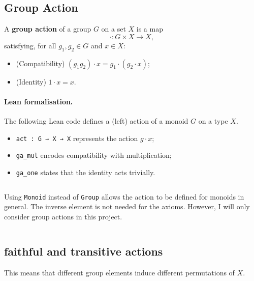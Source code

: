 \documentclass[
  12pt, %
]{assignment}
\newenvironment{mydef}
  {\begin{framed}}
  {\end{framed}}
\newcommand{\leancodeurl}{}
\newcommand{\setleancodeurl}[1]{\renewcommand{\leancodeurl}{#1}}
\newcommand{\leancodefile}[3][]{%
  \setleancodeurl{#3}%
  \inputminted[fontsize=\footnotesize,breaklines,breakanywhere,tabsize=4,showspaces=false,linenos=true,#1]{lean4}{#2}%
}
\begin{document}
\subsection{Group Action}
\begin{center}
	\begin{minipage}[t]{0.47\textwidth}
		\begin{mydef}
			A \textbf{group action} of a group $G$ on a set $X$ is a map
			\[
				\cdot : G \times X \to X,
			\]
			satisfying, for all $g_1,g_2\in G$ and $x\in X$:
			\begin{itemize}
				\item (Compatibility) $(g_1 g_2)\cdot x = g_1\cdot(g_2\cdot x)$;
				\item (Identity) $1\cdot x = x$.
			\end{itemize}
		\end{mydef}
	\end{minipage}
	\hfill
	\begin{minipage}[t]{0.47\textwidth}
		\paragraph{Lean formalisation.}
		The following Lean code defines a (left) action of a monoid $G$ on a type $X$.
		\begin{itemize}
			\item \texttt{act : G → X → X} represents the action $g\cdot x$;
			\item \texttt{ga\_mul} encodes compatibility with multiplication;
			\item \texttt{ga\_one} states that the identity acts trivially.
		\end{itemize}
	\end{minipage}
\end{center}

\vspace{1em}

\leancodefile[
	firstline=20,
	lastline=23,
	firstnumber=20
]{../lean/GroupAction/Defs.lean}
{https://github.com/FrankieeW/GroupAction/blob/v1.0.0/lean/GroupAction/Defs.lean}

Using \texttt{Monoid} instead of \texttt{Group} allows the action to be defined
for monoids in general. The inverse element is not needed for the axioms.
However, I will only consider group actions in this project.
\leancodefile[firstline=13,lastline=13,firstnumber=13]{../lean/GroupAction/Basic.lean}{https://github.com/FrankieeW/GroupAction/blob/v1.0.0/lean/GroupAction/Basic.lean}
\subsection{faithful and transitive actions}
This means that different group elements induce different permutations of $X$.
\leancodefile[firstline=26,lastline=30,firstnumber=26]{../lean/GroupAction/Defs.lean}{https://github.com/FrankieeW/GroupAction/blob/v1.0.0/lean/GroupAction/Defs.lean}
\end{document}
